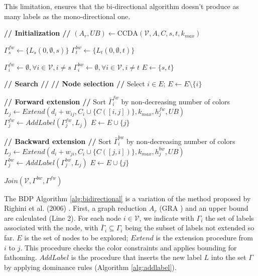 \documentclass[pdflatex,sn-mathphys-num]{sn-jnl}
\begin{document}
This limitation, ensures that the bi-directional algorithm doesn't produce as many labels as the mono-directional one.

\begin{algorithm}[H]
\caption{Bounded Bi-directional Dynamic Programming}
\label{alg:bidirectional}
\begin{algorithmic}[1]
\STATE \textbf{// Initialization //}
\STATE $(A_r, UB) \leftarrow \text{CCDA}(\mathcal{V}, A, C, s, t, k_{max})$

\STATE $\Gamma_s^{fw} \leftarrow \{L_s(0, \emptyset, s)\}$
\STATE $\Gamma_t^{bw} \leftarrow \{L_t(0, \emptyset, t)\}$

\STATE $\Gamma_i^{fw} \leftarrow \emptyset, \forall i \in \mathcal{V}, i \neq s$
\STATE $\Gamma_i^{bw} \leftarrow \emptyset, \forall i \in \mathcal{V}, i \neq t$
\STATE $E \leftarrow \{s, t\}$

\STATE \textbf{// Search //}
    \STATE \textbf{// Node selection //}
    \STATE Select $i \in E$; $E \leftarrow E \setminus \{i\}$
    
    \STATE \textbf{// Forward extension //}
    \STATE Sort $\bar{\Gamma}_i^{fw}$ by non-decreasing number of colors
                \STATE $L_j \leftarrow Extend(d_i + w_{ij}, C_i \cup \{C([i,j])\}, k_{max}, h_j^{fw}, UB)$
                \STATE $\Gamma_j^{fw} \leftarrow AddLabel(\Gamma_j^{fw}, L_j)$
                    \STATE $E \leftarrow E \cup \{j\}$ 
            \ENDIF
        \ENDFOR
    \ENDFOR

    \STATE \textbf{// Backward extension //}
    \STATE Sort $\bar{\Gamma}_i^{bw}$ by non-decreasing number of colors
                \STATE $L_j \leftarrow Extend(d_i + w_{ji}, C_i \cup \{C([j,i])\}, k_{max}, h_j^{bw}, UB)$
                \STATE $\Gamma_j^{bw} \leftarrow AddLabel(\Gamma_j^{bw}, L_j)$
                    \STATE $E \leftarrow E \cup \{j\}$ 
                \ENDIF
        \ENDFOR
    \ENDFOR

\ENDWHILE
\STATE $Join(\mathcal{V}, \Gamma^{bw},\Gamma^{fw})$
\end{algorithmic}
\end{algorithm}

The BDP Algorithm \ref{alg:bidirectional} is a variation of the method proposed by Righini et al. (2006) \cite{righini2006}.
First, a graph reduction $A_r$ (GRA \cite{CerroneRusso2023}) and an upper bound are calculated (Line 2).
For each node $i \in \mathcal{V}$, we indicate with $\Gamma_i$ the set of labels associated with the node, with $\bar{\Gamma}_i \subseteq \Gamma_i$ being the
subset of labels not extended so far. $E$ is the set of nodes to be explored;
$Extend$ is the extension procedure from $i$ to $j$. This procedure checks the color constraints and applies bounding for fathoming. 
$AddLabel$ is the procedure that inserts the new label $L$ into the set $\Gamma$ by applying dominance rules (Algorithm \ref{alg:addlabel}).
\end{document}
